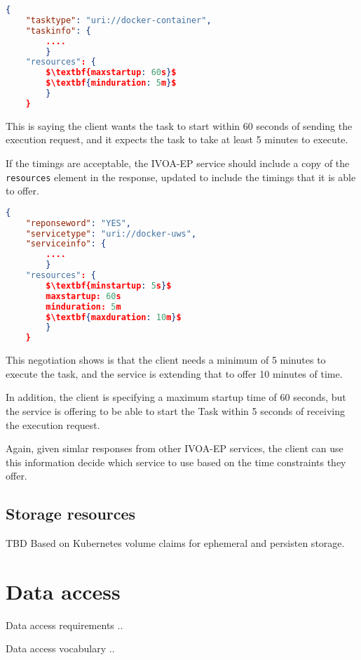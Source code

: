 \documentclass[11pt,a4paper]{ivoa}
\newcommand{\ivoep} {IVOA-EP\xspace}
\newcommand{\codeword}[1] {\texttt{#1}}
\begin{document}
\begin{lstlisting}[language=json, mathescape=true]
    {
    "tasktype": "uri://docker-container",
    "taskinfo": {
        ....
        }
    "resources": {
        $\textbf{maxstartup: 60s}$
        $\textbf{minduration: 5m}$
        }
    }
\end{lstlisting}

This is saying the client wants the task to start within 60 seconds of sending the execution request, and it expects the task to take at least 5 minutes to execute.

If the timings are acceptable, the \ivoep service should include a copy of the \codeword{resources} element in the response, updated to include the timings that it is able to offer.

\begin{lstlisting}[language=json, mathescape=true]
    {
    "reponseword": "YES",
    "servicetype": "uri://docker-uws",
    "serviceinfo": {
        ....
        }
    "resources": {
        $\textbf{minstartup: 5s}$
        maxstartup: 60s
        minduration: 5m
        $\textbf{maxduration: 10m}$
        }
    }
\end{lstlisting}

This negotiation shows is that the client needs a minimum of 5 minutes to execute the task,
and the service is extending that to offer 10 minutes of time.

In addition, the client is specifying a maximum startup time of 60 seconds,
but the service is offering to be able to start the Task within 5 seconds
of receiving the execution request.

Again, given simlar responses from other \ivoep services, the client can use this information decide which service to use based on the time constraints they offer.

\subsection{Storage resources}
\label{sec:storage-resources}

TBD
Based on Kubernetes volume claims for ephemeral and persisten storage.


\section{Data access}
\label{sec:data-access}

Data access requirements ..

Data access vocabulary ..
\end{document}
